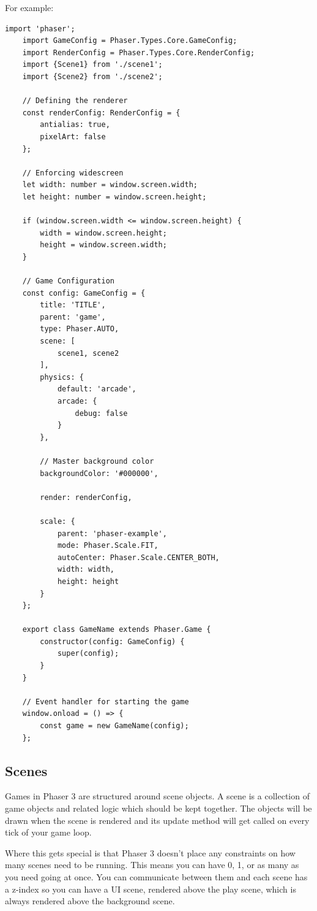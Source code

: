 For example:
\begin{lstlisting}[style=TypeScript, caption={Game Setup File}]
    import 'phaser';
    import GameConfig = Phaser.Types.Core.GameConfig;
    import RenderConfig = Phaser.Types.Core.RenderConfig;
    import {Scene1} from './scene1';
    import {Scene2} from './scene2';

    // Defining the renderer
    const renderConfig: RenderConfig = {
        antialias: true,
        pixelArt: false
    };

    // Enforcing widescreen
    let width: number = window.screen.width;
    let height: number = window.screen.height;

    if (window.screen.width <= window.screen.height) {
        width = window.screen.height;
        height = window.screen.width;
    }

    // Game Configuration
    const config: GameConfig = {
        title: 'TITLE',
        parent: 'game',
        type: Phaser.AUTO,
        scene: [
            scene1, scene2
        ],
        physics: {
            default: 'arcade',
            arcade: {
                debug: false
            }
        },

        // Master background color
        backgroundColor: '#000000',

        render: renderConfig,

        scale: {
            parent: 'phaser-example',
            mode: Phaser.Scale.FIT,
            autoCenter: Phaser.Scale.CENTER_BOTH,
            width: width,
            height: height
        }
    };

    export class GameName extends Phaser.Game {
        constructor(config: GameConfig) {
            super(config);
        }
    }

    // Event handler for starting the game
    window.onload = () => {
        const game = new GameName(config);
    };
\end{lstlisting}

\subsection{Scenes}\label{subsec:scenes}
Games in Phaser 3 are structured around scene objects.
A scene is a collection of game objects and related logic which should be kept together.
The objects will be drawn when the scene is rendered and its update method will get called on every tick of your game loop.

Where this gets special is that Phaser 3 doesn't place any constraints on how many scenes need to be running.
This means you can have 0, 1, or as many as you need going at once.
You can communicate between them and each scene has a z-index so you can have a
UI scene, rendered above the play scene, which is always rendered above the background scene.

